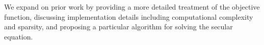 \documentclass[conference]{IEEEtran}
\begin{document}
We expand on prior work by providing a more detailed treatment of the objective function, discussing implementation details including computational complexity and sparsity, and proposing a particular algorithm for solving the secular equation.

%



\end{document}
